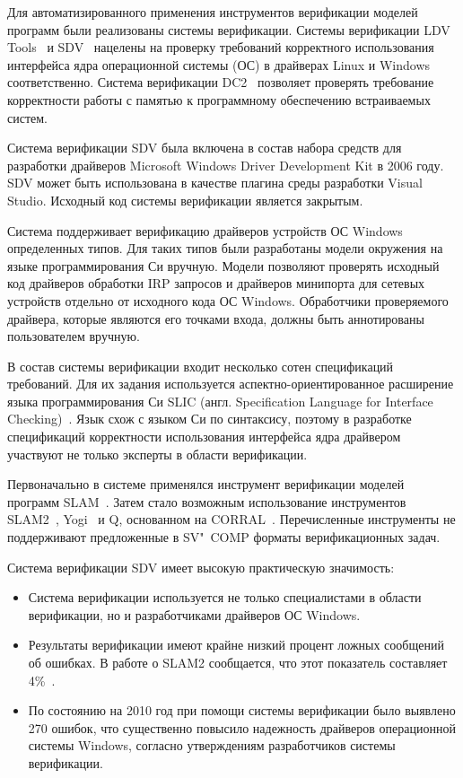 Для автоматизированного применения инструментов верификации моделей программ были реализованы системы верификации.
Системы верификации LDV Tools~\cite{Zakharov2015} и SDV~\cite{Ball2004} нацелены на проверку требований корректного использования интерфейса ядра операционной системы (ОС) в драйверах Linux и Windows соответственно.
Система верификации DC2~\cite{Ivancic:2015:SSS} позволяет проверять требование корректности работы с памятью к программному обеспечению встраиваемых систем.

Система верификации SDV была включена в состав набора средств для разработки драйверов Microsoft Windows Driver Development Kit в 2006 году.
SDV может быть использована в качестве плагина среды разработки Visual Studio.
Исходный код системы верификации является закрытым.

Система поддерживает верификацию драйверов устройств ОС Windows определенных типов.
Для таких типов были разработаны модели окружения на языке программирования Си вручную.
Модели позволяют проверять исходный код драйверов обработки IRP запросов и драйверов минипорта для сетевых устройств отдельно от исходного кода ОС Windows.
Обработчики проверяемого драйвера, которые являются его точками входа, должны быть аннотированы пользователем вручную.

В состав системы верификации входит несколько сотен спецификаций требований.
Для их задания используется аспектно-ориентированное расширение языка программирования Си SLIC (англ. Specification Language for Interface Checking)~\cite{SLIC}.
Язык схож с языком Си по синтаксису, поэтому в разработке спецификаций корректности использования интерфейса ядра драйвером участвуют не только эксперты в области верификации.

Первоначально в системе применялся инструмент верификации моделей программ SLAM~\cite{Ball:2011:DSM}.
Затем стало возможным использование инструментов SLAM2~\cite{SLAM2}, Yogi~\cite{Yogi} и Q, основанном на CORRAL~\cite{Lal:2014:PSD}. 
Перечисленные инструменты не поддерживают предложенные в SV"~COMP форматы верификационных задач.

Система верификации SDV имеет высокую практическую значимость:
\begin{itemize}
\item Система верификации используется не только специалистами в области верификации, но и разработчиками драйверов ОС Windows.
\item Результаты верификации имеют крайне низкий процент ложных сообщений об ошибках. 
В работе о SLAM2 сообщается, что этот показатель составляет 4\%~\cite{SLAM2}.
\item По состоянию на 2010 год при помощи системы верификации было выявлено 270 ошибок, что существенно повысило надежность драйверов операционной системы Windows, согласно утверждениям разработчиков системы верификации.
\end{itemize}

